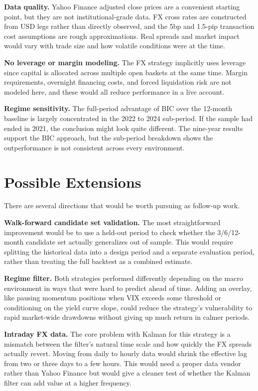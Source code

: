 \documentclass[12pt]{article}
\begin{document}
\textbf{Data quality.} Yahoo Finance adjusted close prices are a convenient starting point, but they are not institutional-grade data. FX cross rates are constructed from USD legs rather than directly observed, and the 5bp and 1.5-pip transaction cost assumptions are rough approximations. Real spreads and market impact would vary with trade size and how volatile conditions were at the time.

\textbf{No leverage or margin modeling.} The FX strategy implicitly uses leverage since capital is allocated across multiple open baskets at the same time. Margin requirements, overnight financing costs, and forced liquidation risk are not modeled here, and these would all reduce performance in a live account.

\textbf{Regime sensitivity.} The full-period advantage of BIC over the 12-month baseline is largely concentrated in the 2022 to 2024 sub-period. If the sample had ended in 2021, the conclusion might look quite different. The nine-year results support the BIC approach, but the sub-period breakdown shows the outperformance is not consistent across every environment.

\section{Possible Extensions}

There are several directions that would be worth pursuing as follow-up work.

\textbf{Walk-forward candidate set validation.} The most straightforward improvement would be to use a held-out period to check whether the 3/6/12-month candidate set actually generalizes out of sample. This would require splitting the historical data into a design period and a separate evaluation period, rather than treating the full backtest as a combined estimate.

\textbf{Regime filter.} Both strategies performed differently depending on the macro environment in ways that were hard to predict ahead of time. Adding an overlay, like pausing momentum positions when VIX exceeds some threshold or conditioning on the yield curve slope, could reduce the strategy's vulnerability to rapid market-wide drawdowns without giving up much return in calmer periods.

\textbf{Intraday FX data.} The core problem with Kalman for this strategy is a mismatch between the filter's natural time scale and how quickly the FX spreads actually revert. Moving from daily to hourly data would shrink the effective lag from two or three days to a few hours. This would need a proper data vendor rather than Yahoo Finance but would give a cleaner test of whether the Kalman filter can add value at a higher frequency.
\end{document}
